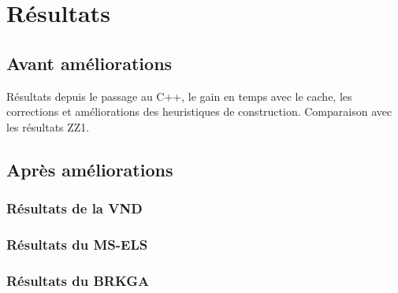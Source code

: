 \chapter{Résultats}
    \section{Avant améliorations}
    	Résultats depuis le passage au C++, le gain en temps avec le cache, les corrections et améliorations des heuristiques de construction.
    	Comparaison avec les résultats ZZ1.
    \section{Après améliorations}
    	\subsection{Résultats de la VND}
    	\subsection{Résultats du MS-ELS}
    	\subsection{Résultats du BRKGA}

